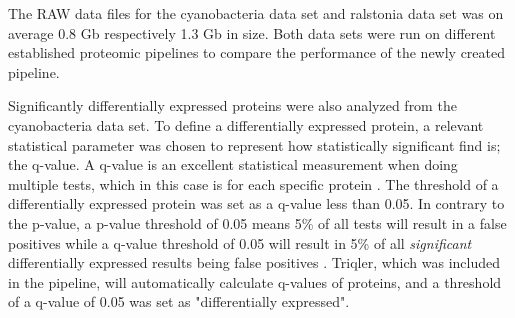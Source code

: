 The RAW data files for the cyanobacteria data set and ralstonia data set was on average 0.8 Gb respectively 1.3 Gb in size. Both data sets were run on different established proteomic pipelines to compare the performance of the newly created pipeline.

Significantly differentially expressed proteins were also analyzed from the cyanobacteria data set. To define a differentially expressed protein, a relevant statistical parameter was chosen to represent how statistically significant find is; the q-value. A q-value is an excellent statistical measurement when doing multiple tests, which in this case is for each specific protein \cite{q-value}. The threshold of a differentially expressed protein was set as a q-value less than 0.05. In contrary to the p-value, a p-value threshold of 0.05 means 5\% of all tests will result in a false positives while a q-value threshold of 0.05 will result in 5\% of all \textit{significant} differentially expressed results being false positives \cite{q-value}. Triqler, which was included in the pipeline, will automatically calculate q-values of proteins, and a threshold of a q-value of 0.05 was set as "differentially expressed".
